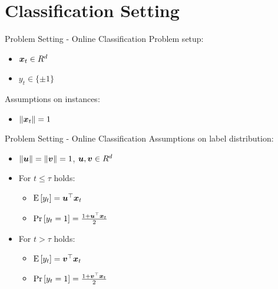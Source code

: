 \documentclass{beamer}
\begin{document}
\section{Classification Setting}




\begin{frame}{Problem Setting - Online Classification}
Problem setup:\newline
\begin{itemize}
\item ${\boldsymbol{x}}_{t}\in R^d$\newline
\item $y_t\in\{\pm1\}$\newline
\end{itemize}
Assumptions on instances:\newline
\begin{itemize}
\item $\|{\boldsymbol{x}}_{t}\|=1$
\end{itemize}
\end{frame}

\begin{frame}{Problem Setting - Online Classification}
Assumptions on label distribution:\newline
\begin{itemize}
\item $\|{\boldsymbol{u}}\|=\|{\boldsymbol{v}}\|=1$, ${\boldsymbol{u}},{\boldsymbol{v}}\in R^d$ \newline
\item For $t\leq\tau$ holds:\newline
\begin{itemize}
\item  ${\rm E}\left[{y_t}\right]={{\boldsymbol{u}}}^{\top}{\boldsymbol{x}}_{t}$\newline
\item  ${\rm Pr}\left[{y_t=1}\right]=\frac{1+{{\boldsymbol{u}}}^{\top}{\boldsymbol{x}}_{t}}{2}$\newline
\end{itemize}
\item For $t>\tau$ holds:\newline
\begin{itemize}
\item ${\rm E}\left[{y_t}\right]={{\boldsymbol{v}}}^{\top}{\boldsymbol{x}}_{t}$\newline
\item ${\rm Pr}\left[{y_t=1}\right]=\frac{1+{{\boldsymbol{v}}}^{\top}{\boldsymbol{x}}_{t}}{2}$\newline
\end{itemize}
\end{itemize}
\end{frame}
\end{document}
